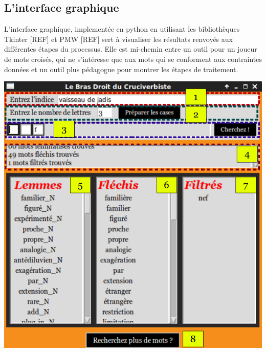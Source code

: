 \documentclass[a4paper, 12pt]{article}
\begin{document}
\subsection{L'interface graphique}

L'interface graphique, implementée en python en utilisant les bibliothèques Tkinter [REF] et PMW [REF] sert à visualiser les résultats renvoyés aux différentes étapes du processus. Elle est mi-chemin entre un outil pour un joueur de mots croisés, qui ne s'intéresse que aux mots qui se conforment aux contraintes données et un outil plus pédagogue pour montrer les étapes de traitement.

\begin{center}
\includegraphics{Images/CrossWordInterface.png}
\end{center}
\end{document}
